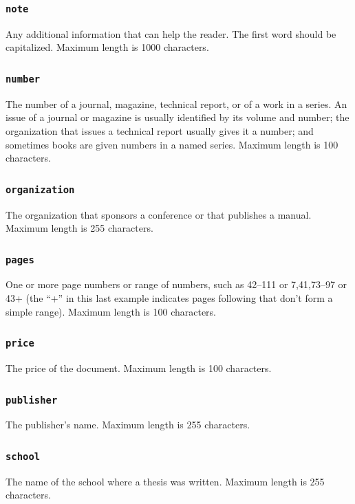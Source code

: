 \documentclass[letterpaper,10pt,english]{sphinxmanual}
\begin{document}
\subsubsection{\texttt{note}}
\label{datastructure:note}
Any additional information that can help the reader.  The first word should be
capitalized.  Maximum length is 1000 characters.


\subsubsection{\texttt{number}}
\label{datastructure:number}
The number of a journal, magazine, technical report, or of a work in a series.
An issue of a journal or magazine is usually identified by its volume and
number; the organization that issues a technical report usually gives it a
number; and sometimes books are given numbers in a named series.  Maximum length
is 100 characters.


\subsubsection{\texttt{organization}}
\label{datastructure:organization}
The organization that sponsors a conference or that publishes a manual.  Maximum
length is 255 characters.


\subsubsection{\texttt{pages}}
\label{datastructure:pages}
One or more page numbers or range of numbers, such as 42--111 or 7,41,73--97 or
43+ (the ``+'' in this last example indicates pages following that don't form a
simple range).  Maximum length is 100 characters.


\subsubsection{\texttt{price}}
\label{datastructure:price}
The price of the document.  Maximum length is 100 characters.


\subsubsection{\texttt{publisher}}
\label{datastructure:publisher}
The publisher's name.  Maximum length is 255 characters.


\subsubsection{\texttt{school}}
\label{datastructure:school}
The name of the school where a thesis was written.  Maximum length is 255
characters.
\end{document}
